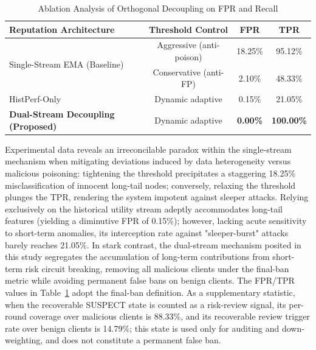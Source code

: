 \documentclass[final,5p,times,twocolumn]{elsarticle/elsarticle}
\begin{document}
\begin{table}[t]
    \centering
    \caption{Ablation Analysis of Orthogonal Decoupling on FPR and Recall}
    \label{tab:ablation_stream}
    \begin{tabular}{l c c c}
        \toprule
        \textbf{Reputation Architecture}              & \textbf{Threshold Control} & \textbf{FPR}    & \textbf{TPR}      \\
        \midrule
        \multirow{2}{*}{Single-Stream EMA (Baseline)} & Aggressive (anti-poison)   & 18.25\%         & 95.12\%           \\
                                                      & Conservative (anti-FP)     & 2.10\%          & 48.33\%           \\
        \midrule
        HistPerf-Only                                 & Dynamic adaptive           & 0.15\%          & 21.05\%           \\
        \textbf{Dual-Stream Decoupling (Proposed)}    & Dynamic adaptive           & \textbf{0.00\%} & \textbf{100.00\%} \\
        \bottomrule
    \end{tabular}
\end{table}

Experimental data reveals an irreconcilable paradox within the single-stream mechanism when mitigating deviations induced by data heterogeneity versus malicious poisoning: tightening the threshold precipitates a staggering 18.25\% misclassification of innocent long-tail nodes; conversely, relaxing the threshold plunges the TPR, rendering the system impotent against sleeper attacks. Relying exclusively on the historical utility stream adeptly accommodates long-tail features (yielding a diminutive FPR of 0.15\%); however, lacking acute sensitivity to short-term anomalies, its interception rate against "sleeper-burst" attacks barely reaches 21.05\%. In stark contrast, the dual-stream mechanism posited in this study segregates the accumulation of long-term contributions from short-term risk circuit breaking, removing all malicious clients under the final-ban metric while avoiding permanent false bans on benign clients. The FPR/TPR values in Table~\ref{tab:ablation_stream} adopt the final-ban definition. As a supplementary statistic, when the recoverable SUSPECT state is counted as a risk-review signal, its per-round coverage over malicious clients is 88.33\%, and its recoverable review trigger rate over benign clients is 14.79\%; this state is used only for auditing and down-weighting, and does not constitute a permanent false ban.
\end{document}
